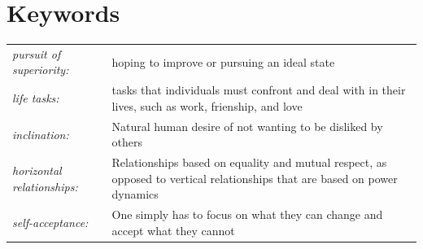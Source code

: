 \section*{Keywords}
\begin{tabularx}{\textwidth}{ l X }
    \textit{pursuit of superiority:} & hoping to improve or pursuing an ideal state \\ 
    \textit{life tasks:} & tasks that individuals must confront and deal with in their lives, such as work, frienship, and love \\
    \textit{inclination:} & Natural human desire of not wanting to be disliked by others \\
    \textit{horizontal relationships:} & Relationships based on equality and mutual respect, as opposed to vertical relationships that are based on power dynamics \\
    \textit{self-acceptance:} & One simply has to focus on what they can change and accept what they cannot \\

\end{tabularx}
